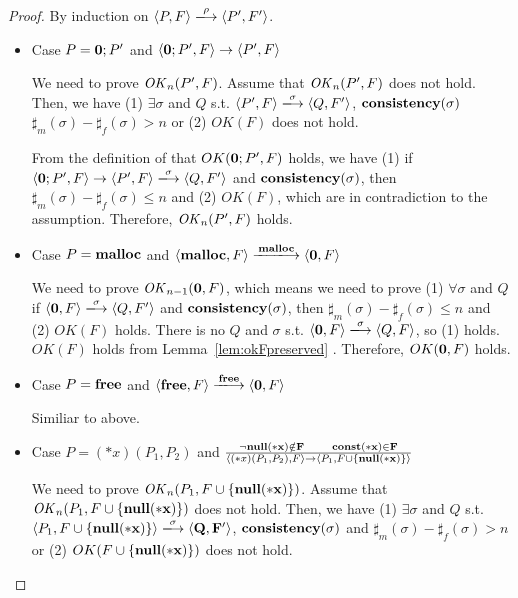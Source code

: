 \begin{proof}
By induction on \(\langle P, F \rangle \xlongrightarrow{\rho} \langle P', F' \rangle \).

\begin{itemize}

\item Case \(P = {\bf 0};P'\) and \( \langle {\bf 0};P', F \rangle \rightarrow \langle P', F \rangle\)

  We need to prove \(\mathit{OK}_n(P', F)\).  Assume that \(\mathit{OK}_n(P', F)\)
  does not hold. Then, we have (1) \( \exists \sigma \) and \(Q\) s.t. \(
  \langle P', F \rangle \xlongrightarrow{\sigma} \langle Q, F' \rangle
  \), \(\mathbf{consistency}(\sigma)\) \(\sharp_{m}(\sigma) - \sharp_{f}(\sigma) > n\) or (2) \(
  OK(F)\) does not hold.

  From the definition of that \(OK({\bf 0};P', F)\) holds, we have (1)
  if \( \langle {\bf 0};P', F \rangle \rightarrow \langle P', F
  \rangle \xlongrightarrow{\sigma} \langle Q, F' \rangle \) and
  \(\mathbf{consistency}(\sigma)\), then \(\sharp_m(\sigma) - \sharp_f(\sigma) \le n \) and
  (2) \(OK(F)\), which are in contradiction to the
  assumption. Therefore, \(\mathit{OK}_n(P', F)\) holds.

\item Case \(P = \mathbf{malloc}\) and \( \langle \Malloc, F \rangle \xlongrightarrow{\Malloc} \langle {\bf 0}, F \rangle\)

  We need to prove \(\mathit{OK}_{n-1}({\bf 0}, F)\), which means we need to
  prove (1) \( \forall \sigma \) and \(Q\) if \( \langle {\bf 0}, F
  \rangle \xlongrightarrow{\sigma} \langle Q, F' \rangle \) and
  \(\mathbf{consistency}(\sigma)\), then \(\sharp_{m}(\sigma) - \sharp_{f}(\sigma) \le n\)
  and (2) \( OK(F)\) holds.  There is no \(Q\) and \(\sigma\)
  s.t. \(\langle {\bf 0}, F \rangle \xlongrightarrow{\sigma} \langle
  Q, F \rangle \), so (1) holds.  \(OK(F)\) holds from
  Lemma~\ref{lem:okFpreserved} . Therefore, \(OK({\bf 0}, F)\) holds.
  
\item Case \(P = \mathbf{free}\) and \(\langle \Free, F \rangle \xlongrightarrow{\Free} \langle {\bf 0}, F \rangle \)

  Similiar to above.

\item Case \( P = (*x)(P_1,P_2) \) and \( \frac{\neg\bf{null}(*x) \notin F
      \quad\quad \mathbf{const}(*x) \in F} { \langle (*x)(P_1, P_2), F \rangle
      \rightarrow \langle P_1, F\cup \{\bf{null}(*x) \} \rangle } \) 

  We need to prove \(\mathit{OK}_n(P_1, F\cup\{\bf{null}(*x)\})\).  Assume that
  \(\mathit{OK}_n(P_1, F\cup\{\bf{null}(*x)\})\) does not hold. Then, we have (1) \(
  \exists \sigma \) and \(Q\) s.t. \( \langle P_1, F\cup\{\snull\}
  \rangle \xlongrightarrow{\sigma} \langle Q, F' \rangle \),
  \(\mathbf{consistency}(\sigma)\) and \(\sharp_{m}(\sigma) - \sharp_{f}(\sigma) > n\) or
  (2) \( OK(F\cup\{\bf{null}(*x)\})\) does not hold.


\end{itemize}
\end{proof}

